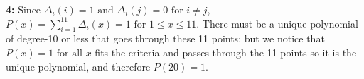 \documentclass[11pt,fleqn]{article}
\begin{document}
\begin{enumerate}
\textbf{4:} Since $\Delta_i(i) = 1 \text{ and } \Delta_i(j) = 0 \text{ for } i \neq j$, $P(x) = \sum_{i=1}^{11} \Delta_i(x) = 1 \text{ for } 1 \leq x \leq 11$.
There must be a unique polynomial of degree-10 or less that goes through these 11 points; but we notice that $P(x) = 1 \text{ for all } x$ fits the criteria and passes through the 11 points so it is the unique polynomial, and therefore $P(20) = 1$.

\end{enumerate}
\end{document}
